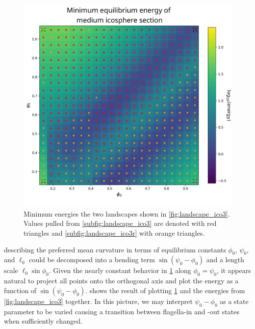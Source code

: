 \begin{figure}[ptbh]
	\centering
	\includegraphics[width=\textwidth]{landscape_merge.png}
	\caption[Combined energy landscape of \cref{fig:landscape_ico3}]{Minimum energies the two landscapes shown in \cref{fig:landscape_ico3}. Values pulled from \cref{subfig:landscape_ico3} are denoted with red triangles and \cref{subfig:landscape_ico3r} with orange triangles.}
	\label{fig:landscape_merge}
\end{figure}

 describing the preferred mean curvature in terms of equilibrium constants $\phi_0$, $\psi_0$, and $\ell_0$ could be decomposed into a bending term $\sin(\psi_0 - \phi_0)$ and a length scale $\ell_0 \sin \phi_0$. 
Given the nearly constant behavior in \cref{fig:landscape_merge} along $\phi_0 = \psi_0$, it appears natural to project all points onto the orthogonal axis and plot the energy as a function of $\sin(\psi_0 - \phi_0)$. 
 shows the result of plotting \cref{fig:landscape_merge} and the energies from \cref{fig:landscape_ico3} together. 
In this picture, we may interpret $\psi_0 - \phi_0$ as a state parameter to be varied causing a transition between flagella-in and -out states when sufficiently changed.

